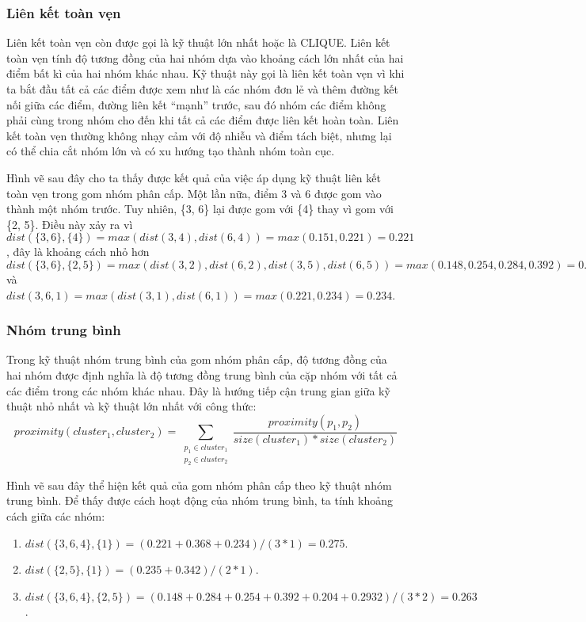 \subsubsection{Liên kết toàn vẹn}		
Liên kết toàn vẹn còn được gọi là kỹ thuật lớn nhất hoặc là CLIQUE.
Liên kết toàn vẹn tính độ tương đồng của hai nhóm dựa vào khoảng cách lớn nhất của hai điểm bất kì của hai nhóm khác nhau.
Kỹ thuật này gọi là liên kết toàn vẹn vì khi ta bắt đầu tất cả các điểm được xem như là các nhóm đơn lẻ và thêm đường kết nối giữa các điểm, đường liên kết ``mạnh'' trước, sau đó nhóm các điểm không phải cùng trong nhóm cho đến khi tất cả các điểm được liên kết hoàn toàn.
Liên kết toàn vẹn thường không nhạy cảm với độ nhiễu và điểm tách biệt, nhưng lại có thể chia cắt nhóm lớn và có xu hướng tạo thành nhóm toàn cục.

Hình vẽ sau đây cho ta thấy được kết quả của việc áp dụng kỹ thuật liên kết toàn vẹn trong gom nhóm phân cấp.
Một lần nữa, điểm 3 và 6 được gom vào thành một nhóm trước.
Tuy nhiên, \{3, 6\} lại được gom với \{4\} thay vì gom với \{2, 5\}.
Điều này xảy ra vì $dist(\{3, 6\}, \{4\}) = max(dist(3, 4), dist(6, 4)) = max(0.151, 0.221) = 0.221$, đây là khoảng cách nhỏ hơn $dist(\{3, 6\}, \{2, 5\}) = max(dist(3, 2), dist(6, 2), dist(3, 5), dist(6, 5)) = max(0.148, 0.254, 0.284, 0.392) = 0.392$ và $dist({3, 6}, {1}) = max(dist(3, 1), dist(6, 1)) = max(0.221, 0.234) = 0.234$.


\subsubsection{Nhóm trung bình}
Trong kỹ thuật nhóm trung bình của gom nhóm phân cấp, độ tương đồng của hai nhóm được định nghĩa là độ tương đồng trung bình của cặp nhóm với tất cả các điểm trong các nhóm khác nhau.
Đây là hướng tiếp cận trung gian giữa kỹ thuật nhỏ nhất và kỹ thuật lớn nhất với công thức: 
\begin{equation}
proximity(cluster_1, cluster_2) = \sum_{\substack{p_1 \in cluster_1 \\ p_2 \in cluster_2}} \frac{proximity(p_1, p_2)}{size(cluster_1) * size(cluster_2)}
\end{equation}

Hình vẽ sau đây thể hiện kết quả của gom nhóm phân cấp theo kỹ thuật nhóm trung bình.
Để thấy được cách hoạt động của nhóm trung bình, ta tính khoảng cách giữa các nhóm:
\begin{enumerate}
\item[]$dist(\{3, 6, 4\}, \{1\}) = (0.221 + 0.368 + 0.234) / (3 * 1) = 0.275$. 
\item[]$dist(\{2, 5\}, \{1\}) = (0.235 + 0.342) / (2 * 1)$.
\item[]$dist(\{3, 6, 4\}, \{2, 5\}) = (0.148 + 0.284 + 0.254 + 0.392 + 0.204 + 0.2932) /  (3 * 2) = 0.263$.
\end{enumerate}

